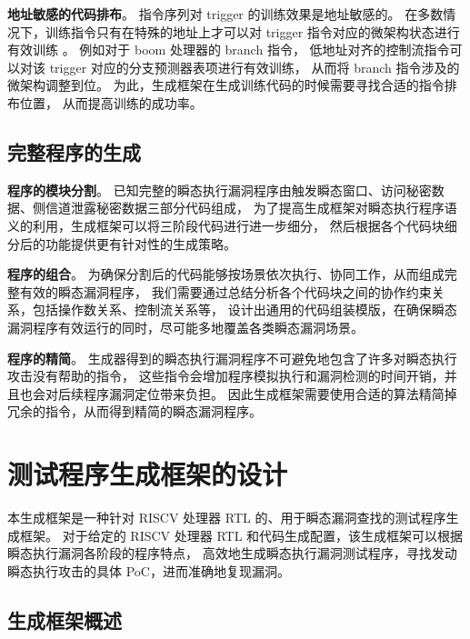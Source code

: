 \textbf{地址敏感的代码排布}。
指令序列对 trigger 的训练效果是地址敏感的。
在多数情况下，训练指令只有在特殊的地址上才可以对 trigger 指令对应的微架构状态进行有效训练 。
例如对于 boom 处理器\cite{celio2017boomv2}的 branch 指令，
低地址对齐的控制流指令可以对该 trigger 对应的分支预测器表项进行有效训练，
从而将 branch 指令涉及的微架构调整到位。
为此，生成框架在生成训练代码的时候需要寻找合适的指令排布位置，
从而提高训练的成功率。 \par

\subsection{完整程序的生成}

\textbf{程序的模块分割}。
已知完整的瞬态执行漏洞程序由触发瞬态窗口、访问秘密数据、侧信道泄露秘密数据三部分代码组成，
为了提高生成框架对瞬态执行程序语义的利用，生成框架可以将三阶段代码进行进一步细分，
然后根据各个代码块细分后的功能提供更有针对性的生成策略。\par

\textbf{程序的组合}。
为确保分割后的代码能够按场景依次执行、协同工作，从而组成完整有效的瞬态漏洞程序，
我们需要通过总结分析各个代码块之间的协作约束关系，包括操作数关系、控制流关系等，
设计出通用的代码组装模版，在确保瞬态漏洞程序有效运行的同时，尽可能多地覆盖各类瞬态漏洞场景。\par

\textbf{程序的精简}。
生成器得到的瞬态执行漏洞程序不可避免地包含了许多对瞬态执行攻击没有帮助的指令，
这些指令会增加程序模拟执行和漏洞检测的时间开销，并且也会对后续程序漏洞定位带来负担。
因此生成框架需要使用合适的算法精简掉冗余的指令，从而得到精简的瞬态漏洞程序。\par

\cleardoublepage
\section{测试程序生成框架的设计}

本生成框架是一种针对 RISCV 处理器 RTL 的、用于瞬态漏洞查找的测试程序生成框架。
对于给定的 RISCV 处理器 RTL 和代码生成配置，该生成框架可以根据瞬态执行漏洞各阶段的程序特点，
高效地生成瞬态执行漏洞测试程序，寻找发动瞬态执行攻击的具体 PoC，进而准确地复现漏洞。 \par

\subsection{生成框架概述}

